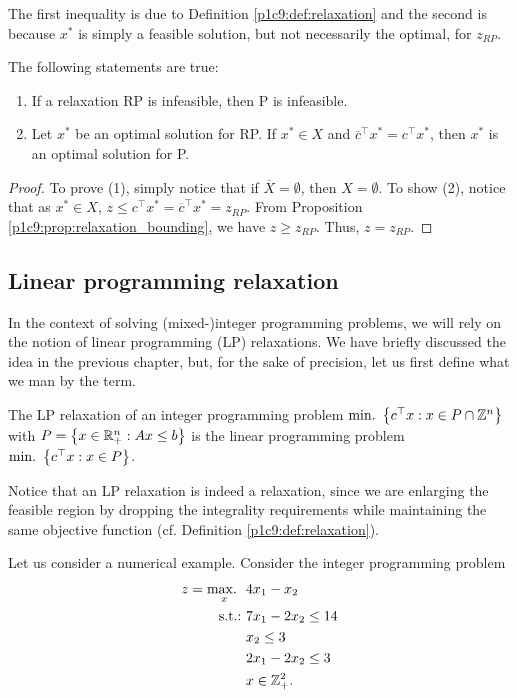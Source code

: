 The first inequality is due to Definition \ref{p1c9:def:relaxation} and the second is because $x^*$ is simply a feasible solution, but not necessarily the optimal, for $z_{RP}$. 

\begin{proposition} \label{p1c9:prop:relaxation_optimality}
  The following statements are true:
  \begin{enumerate}
  	\item If a relaxation RP is infeasible, then P is infeasible. 
  	\item Let $x^*$ be an optimal solution for RP. If $x^* \in X$ and $\overline{c}^\top x^* = c^\top x^*$, then $x^*$ is an optimal solution for P.
  \end{enumerate}
\end{proposition}
%
\begin{proof}
    To prove (1), simply notice that if $\overline{X} = \emptyset$, then $X = \emptyset$. To show (2), notice that as $x^* \in X$, $z \leq c^\top x^* = \overline{c}^\top x^* = z_{RP}$. From Proposition \ref{p1c9:prop:relaxation_bounding}, we have $z \geq z_{RP}$. Thus, $z = z_{RP}$. 
\end{proof}


\subsection{Linear programming relaxation}

In the context of solving (mixed-)integer programming problems, we will rely on the notion of linear programming (LP) relaxations. We have briefly discussed the idea in the previous chapter, but, for the sake of precision, let us first define what we man by the term. 

\begin{definition}
  The LP relaxation of an integer programming problem $\mathop{\text{min.~}} \left\{ c^\top x : x \in P \cap \mathbb{Z}^n \right \}$ with $P = \left\{ x \in \mathbb{R}^n_+ : Ax \leq b \right \}$ is the linear programming problem $\mathop{\text{min.~}} \left\{ c^\top x : x \in P \right \}$.
\end{definition} 

Notice that an LP relaxation is indeed a relaxation, since we are enlarging the feasible region by dropping the integrality requirements while maintaining the same objective function (cf. Definition \ref{p1c9:def:relaxation}).

Let us consider a numerical example. Consider the integer programming problem
% 
\begin{align*}
	z = \mathop{\text{max.~}}_x ~& 4x_1 -x_2 \\
	\mathop{\text{s.t.:~}} &  7x_1 -2x_2 \leq 14 \\
	    & x_2 \leq 3 \\
	    & 2x_1 - 2x_2 \leq 3\\
	    & x \in \mathbb{Z}^2_+. 
\end{align*}

